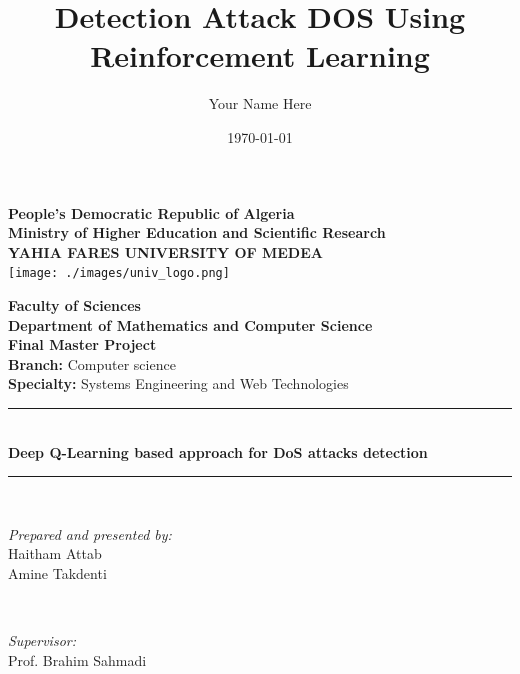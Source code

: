 \documentclass[16pt]{report}
\title{\Huge{\textbf{Detection Attack DOS Using Reinforcement Learning}}}
\author{Your Name Here}
\date{\today}
\begin{document}
\begin{center}
    \textbf{\LARGE People’s Democratic Republic of Algeria}\\[0.2cm]
    \textbf{\large Ministry of Higher Education and Scientific Research}\\[0.2cm]
    \textbf{\Large YAHIA FARES UNIVERSITY OF MEDEA}\\[1cm]

    \texttt{[image: ./images/univ\_logo.png]}\par\vspace{1.5cm}

    \textbf{\Large Faculty of Sciences}\\[0.5cm]
    \textbf{Department of Mathematics and Computer Science}\\[1cm]

    \textbf{\Huge Final Master Project}\\[1.2cm]

    \textbf{\large Branch:} Computer science\\[0.3cm]
    \textbf{\large Specialty:} Systems Engineering and Web Technologies\\[1cm]

    \rule{\linewidth}{0.5mm} \\[0.4cm]
    { \Huge \bfseries Deep Q-Learning based approach for DoS attacks detection \\[0.4cm] }
    \rule{\linewidth}{0.5mm} \\[1.5cm]

    \begin{minipage}{0.4\textwidth}
        \begin{flushleft} \large
            \emph{Prepared and presented by:}\\
            Haitham Attab \\
            Amine Takdenti
        \end{flushleft}
    \end{minipage}~
    \begin{minipage}{0.4\textwidth}
        \begin{flushright} \large
            \emph{Supervisor:}\\
            Prof. Brahim Sahmadi
        \end{flushright}
    \end{minipage}\\[2cm]
\end{center}
\end{document}
